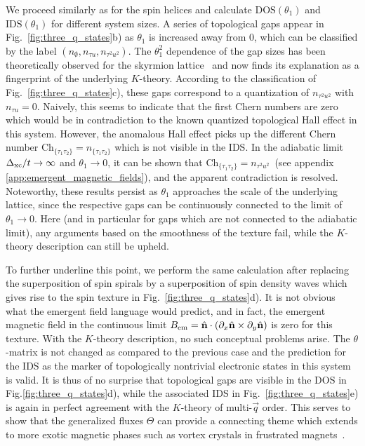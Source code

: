 \documentclass[
    10pt,
    aps,
    prb,
    twocolumn,
    floatfix,
    superscriptaddress,
]{revtex4-2}
\begin{document}
We proceed similarly as for the spin helices and calculate $\mathrm{DOS}(\theta_1)$ and $\mathrm{IDS}(\theta_1)$ for different system sizes.
A series of topological gaps appear in Fig.~\ref{fig:three_q_states}b) as $\theta_1$ is increased away from $0$, which can be classified by the label $(n_\emptyset, n_{\tau u}, n_{\tau^2u^2})$.
The $\theta_1^2$ dependence of the gap sizes has been theoretically observed for the skyrmion lattice~\cite{Hamamoto2015} and now finds its explanation as a fingerprint of the underlying $K$-theory.
According to the classification of Fig.~\ref{fig:three_q_states}c), 
these gaps correspond to a quantization of $n_{\tau^2u^2}$ with $n_{\tau u}=0$.
Naively, this seems to indicate that the first Chern numbers are zero which would be in contradiction to the known quantized topological Hall effect in this system.
However, the anomalous Hall effect picks up the different Chern number $\mathrm{Ch}_{ \lbrace \tau_1 \tau_2 \rbrace } = n_{ \lbrace \tau_1 \tau_2 \rbrace }$ \cite{Prodan2017} which is not visible in the IDS.
In the adiabatic limit $\Delta_\mathrm{xc}/t \to \infty$ and $\theta_1 \to 0$, it can be shown that $\mathrm{Ch}_{ \lbrace \tau_1 \tau_2 \rbrace } = n_{\tau^2u^2}$~(see appendix \ref{app:emergent_magnetic_fields}), and the apparent contradiction is resolved.
Noteworthy, these results persist as $\theta_1$ approaches the scale of the underlying lattice, since the respective gaps can be continuously connected to the limit of $\theta_1 \to 0$.
Here (and in particular for gaps which are not connected to the adiabatic limit), any arguments based on the smoothness of the texture fail, while the $K$-theory description can still be upheld.

To further underline this point, we perform the same calculation after replacing the superposition of spin spirals by a superposition of spin density waves which gives rise to the spin texture in Fig.~\ref{fig:three_q_states}d). 
It is not obvious what the emergent field language would predict, and  
in fact, the emergent magnetic field in the continuous limit  $B_\mathrm{em} = \hat{\mathbf{n}} \cdot(\partial_x \hat{\mathbf{n}} \times \partial_y \hat{\mathbf{n}})$ is zero for this texture.
With the $K$-theory description, no such conceptual problems arise.
The $\theta$-matrix is not changed as compared to the previous case and the prediction for the IDS as the marker of topologically nontrivial electronic states in this system is valid. 
It is thus of no surprise that topological gaps are visible in the DOS in Fig.\ref{fig:three_q_states}d), while the associated IDS in Fig.~\ref{fig:three_q_states}e) is again in perfect agreement with the $K$-theory of multi-$\vec{q}$ order.
This serves to show that the generalized fluxes $\Theta$ can provide a connecting theme which extends to more exotic magnetic phases such as vortex crystals in frustrated magnets~\cite{Wang2015}.
\end{document}
